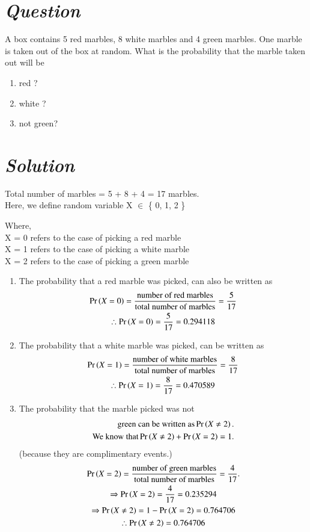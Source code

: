 \documentclass[journal,12pt,twocolumn]{IEEEtran}
\begin{document}
\section * {\emph{Question}}
A box contains 5 red marbles, 8 white marbles and 4 green marbles. One marble is taken out of the box at random. What is the probability that the marble taken out will be
\begin{enumerate}
    \item red ?
    \item white ?
    \item not green?
\end{enumerate} 
\section*{\emph{Solution}}
Total number of marbles = 5 + 8 + 4 = 17 marbles. 
\\Here, we define random variable X $\in$ \{ 0, 1, 2 \}

Where,
\\X = 0 refers to the case of picking a red marble
\\X = 1 refers to the case of picking a white marble
\\X = 2 refers to the case of picking a green marble
   
\begin{enumerate}
    \item The probability that a red marble was picked, can also be written as 
    \begin{multline*}
        \Pr\left(X=0\right) = \frac{\text{number of red marbles}}{\text{total number of marbles}} = \frac{5}{17}
        \\\therefore  \Pr\left(X=0\right) = \frac{5}{17} = 0.294118
    \end{multline*}
    \item The probability that a white marble was picked, can be written as 
    \begin{multline*}
        \Pr\left(X=1\right) = \frac{\text{number of white marbles}}{\text{total number of marbles}}
        = \frac{8}{17} 
        \\\therefore  \Pr\left(X=1\right) = \frac{8}{17} = 0.470589
    \end{multline*}
    \item The probability that the marble picked was not 
    \begin{align*}\text{green can be written as} \Pr\left(X \ne 2\right).
    \\\text{We know that} \Pr\left(X \ne 2\right) + \Pr\left(X = 2\right) = 1. 
    \end{align*}
     (because they are complimentary events.)
    \begin{multline*}
     \Pr\left(X=2\right) = \frac{\text{number of green marbles}}{\text{total number of marbles}}
     = \frac{4}{17}.
     \\\Rightarrow\Pr\left(X=2\right) = \frac{4}{17} = 0.235294
     \\\Rightarrow\Pr\left(X \ne 2\right) = 1 - \Pr\left(X=2\right) = 0.764706
     \\\therefore \Pr\left(X\ne2\right) = 0.764706
    \end{multline*}
\end{enumerate}
\end{document}
